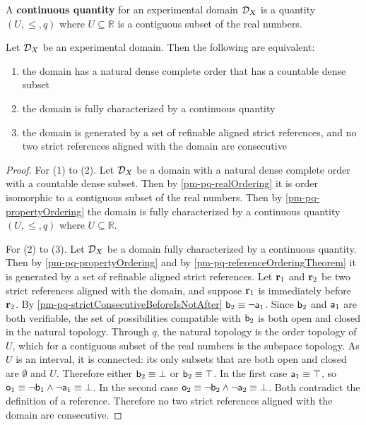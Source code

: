 \begin{mathSection}
	\begin{defn}
		A \textbf{continuous quantity} for an experimental domain $\edomain_X$ is a quantity $(U, \leq, q)$ where $U \subseteq \mathbb{R}$ is a contiguous subset of the real numbers.
	\end{defn}
	\begin{thrm}\label{pm-pq-continuousOrdering}
		Let $\edomain_X$ be an experimental domain. Then the following are equivalent:
		\begin{enumerate}
			\item the domain has a natural dense complete order that has a countable dense subset
			\item the domain is fully characterized by a continuous quantity
			\item the domain is generated by a set of refinable aligned strict references, and no two strict references aligned with the domain are consecutive
		\end{enumerate}
	\end{thrm}
	\begin{proof}
		For (1) to (2). Let $\edomain_X$ be a domain with a natural dense complete order with a countable dense subset. Then by \ref{pm-pq-realOrdering} it is order isomorphic to a contiguous subset of the real numbers. Then by \ref{pm-pq-propertyOrdering} the domain is fully characterized by a continuous quantity $(U, \leq, q)$ where $U \subseteq \mathbb{R}$.
		
		For (2) to (3). Let $\edomain_X$ be a domain fully characterized by a continuous quantity. Then by \ref{pm-pq-propertyOrdering} and by \ref{pm-pq-referenceOrderingTheorem} it is generated by a set of refinable aligned strict references. Let $\refStmt_1$ and $\refStmt_2$ be two strict references aligned with the domain, and suppose $\refStmt_1$ is immediately before $\refStmt_2$. By \ref{pm-pq-strictConsecutiveBeforeIsNotAfter} $\stmt[b]_2 \equiv \NOT \stmt[a]_1$. Since $\stmt[b]_2$ and $\stmt[a]_1$ are both verifiable, the set of possibilities compatible with $\stmt[b]_2$ is both open and closed in the natural topology. Through $q$, the natural topology is the order topology of $U$, which for a contiguous subset of the real numbers is the subspace topology. As $U$ is an interval, it is connected: its only subsets that are both open and closed are $\emptyset$ and $U$. Therefore either $\stmt[b]_2 \equiv \impossibility$ or $\stmt[b]_2 \equiv \certainty$. In the first case $\stmt[a]_1 \equiv \certainty$, so $\stmt[o]_1 \equiv \NOT \stmt[b]_1 \AND \NOT \stmt[a]_1 \equiv \impossibility$. In the second case $\stmt[o]_2 \equiv \NOT \stmt[b]_2 \AND \NOT \stmt[a]_2 \equiv \impossibility$. Both contradict the definition of a reference. Therefore no two strict references aligned with the domain are consecutive.
		

\end{proof}
\end{mathSection}

